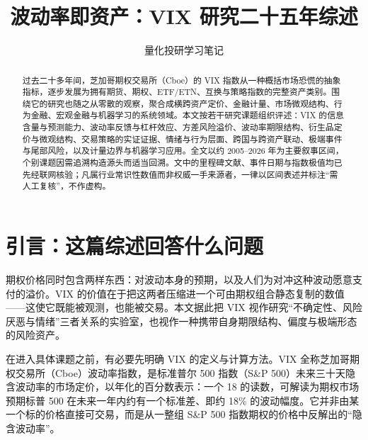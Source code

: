 \documentclass[11pt,a4paper]{ctexart}
\begin{document}
\title{\color{thcolor}\Large\bfseries 波动率即资产：VIX 研究二十五年综述}
\author{量化投研学习笔记}
\date{}
\maketitle

\begin{abstract}
过去二十多年间，芝加哥期权交易所（Cboe）的 VIX 指数从一种概括市场恐慌的抽象指标，逐步发展为拥有期货、期权、ETF/ETN、互换与策略指数的完整资产类别。围绕它的研究也随之从零散的观察，聚合成横跨资产定价、金融计量、市场微观结构、行为金融、宏观金融与机器学习的系统领域。本文按若干研究课题组织评述：VIX 的信息含量与预测能力、波动率反馈与杠杆效应、方差风险溢价、波动率期限结构、衍生品定价与微观结构、交易策略的实证证据、情绪与行为层面、跨国与跨资产联动、极端事件与尾部风险，以及计量边界与机器学习应用。全文以约 2005–2026 年为主要叙事区间，个别课题因需追溯构造源头而适当回溯。文中的里程碑文献、事件日期与指数极值均已先经联网核验；凡属行业常识性数值而非权威一手来源者，一律以区间表述并标注“需人工复核”，不作虚构。
\end{abstract}

\tableofcontents
\clearpage

\section*{引言：这篇综述回答什么问题}

期权价格同时包含两样东西：对波动本身的预期，以及人们为对冲这种波动愿意支付的溢价。VIX 的价值在于把这两者压缩进一个可由期权组合静态复制的数值——这使它既能被观测，也能被交易。本文据此把 VIX 视作研究“不确定性、风险厌恶与情绪”三者关系的实验室，也视作一种携带自身期限结构、偏度与极端形态的风险资产。

在进入具体课题之前，有必要先明确 VIX 的定义与计算方法。VIX 全称芝加哥期权交易所（Cboe）波动率指数，是标准普尔 500 指数（S\&P 500）未来三十天隐含波动率的市场定价，以年化的百分数表示：一个 18 的读数，可解读为期权市场预期标普 500 在未来一年内约有一个标准差、即约 18\% 的波动幅度。它并非由某一个标的价格直接可交易，而是从一整组 S\&P 500 指数期权的价格中反解出的“隐含波动率”。
\end{document}
